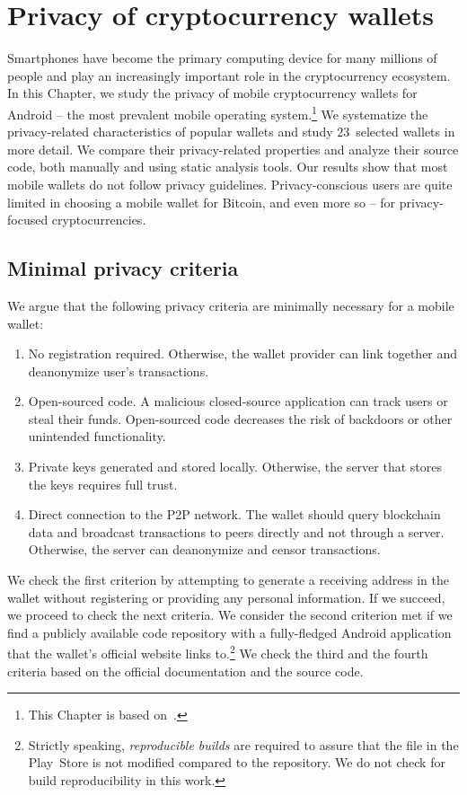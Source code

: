 \chapter{Privacy of cryptocurrency wallets}

\label{Chapter04Wallets}

Smartphones have become the primary computing device for many millions of people and play an increasingly important role in the cryptocurrency ecosystem.
In this Chapter, we study the privacy of mobile cryptocurrency wallets for Android -- the most prevalent mobile operating system.\footnote{This Chapter is based on~\cite{Biryukov2019}.}
We systematize the privacy-related characteristics of popular wallets and study $23$~selected wallets in more detail.
We compare their privacy-related properties and analyze their source code, both manually and using static analysis tools.
Our results show that most mobile wallets do not follow privacy guidelines.
Privacy-conscious users are quite limited in choosing a mobile wallet for Bitcoin, and even more so -- for privacy-focused cryptocurrencies.


\section{Minimal privacy criteria} \label{section:Ch04Initialprivacycriteria}

We argue that the following privacy criteria are minimally necessary for a mobile wallet:
\begin{enumerate}
	\item No registration required. Otherwise, the wallet provider can link together and deanonymize user's transactions.
	\item Open-sourced code. A malicious closed-source application can track users or steal their funds. Open-sourced code decreases the risk of backdoors or other unintended functionality.
	\item Private keys generated and stored locally. Otherwise, the server that stores the keys requires full trust.
	\item Direct connection to the P2P network. The wallet should query blockchain data and broadcast transactions to peers directly and not through a server. Otherwise, the server can deanonymize and censor transactions.
\end{enumerate}
We check the first criterion by attempting to generate a receiving address in the wallet without registering or providing any personal information.
If we succeed, we proceed to check the next criteria.
We consider the second criterion met if we find a publicly available code repository with a fully-fledged Android application that the wallet's official website links to.\footnote{Strictly speaking, \textit{reproducible builds} are required to assure that the file in the Play~Store is not modified compared to the repository. We do not check for build reproducibility in this work.}
We check the third and the fourth criteria based on the official documentation and the source code.

